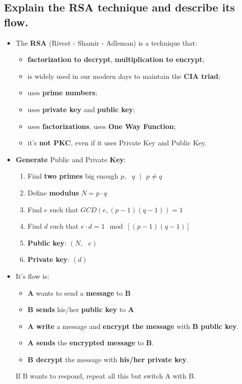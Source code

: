 \documentclass[9pt, letterpaper]{article}
\begin{document}
\newpage

\subsection{Explain the RSA technique and describe its flow.}
\begin{itemize}
	\item The \textbf{RSA} (Rivest - Shamir - Adleman) is a technique that:
	      \begin{itemize}
		      \item \textbf{factorization to decrypt}, \textbf{multiplication to encrypt};
		      \item is widely used in our modern days to maintain the \textbf{CIA triad};
		      \item uses \textbf{prime numbers};
		      \item uses \textbf{private key} and \textbf{public key};
		      \item uses \textbf{factorizations}, uses \textbf{One Way Function};
		      \item it's \textbf{not PKC}, even if it uses Private Key and Public Key.
	      \end{itemize}
	\item \textbf{Generate} Public and Private \textbf{Key}:
	      \begin{enumerate}
		      \item Find \textbf{two primes} big enough $p,\mbox{ }q \mbox{ }|\mbox{ } p\ne q$
		      \item Define \textbf{modulus} $N= p \cdot q$
		      \item Find $e$ such that $GCD(e, (p-1)(q-1)) = 1$
		      \item Find $d$ such that $e \cdot d = 1 \mod [(p-1)(q-1)]$
		      \item \textbf{Public key}: $(N,\mbox{ }e)$
		      \item \textbf{Private key}: $(d)$
	      \end{enumerate}
	\item It's flow is:
	      \begin{itemize}
		      \item \textbf{A} wants to send a \textbf{message} to \textbf{B}
		      \item \textbf{B sends} his/her \textbf{public key} to \textbf{A}
		      \item \textbf{A write} a message and \textbf{encrypt the message} with \textbf{B public key}.
		      \item \textbf{A sends} the \textbf{encrypted message} to \textbf{B}.
		      \item \textbf{B decrypt} the message with \textbf{his/her private key}.
	      \end{itemize}
	      If B wants to respond, repeat all this but switch A with B.
\end{itemize}
\end{document}
